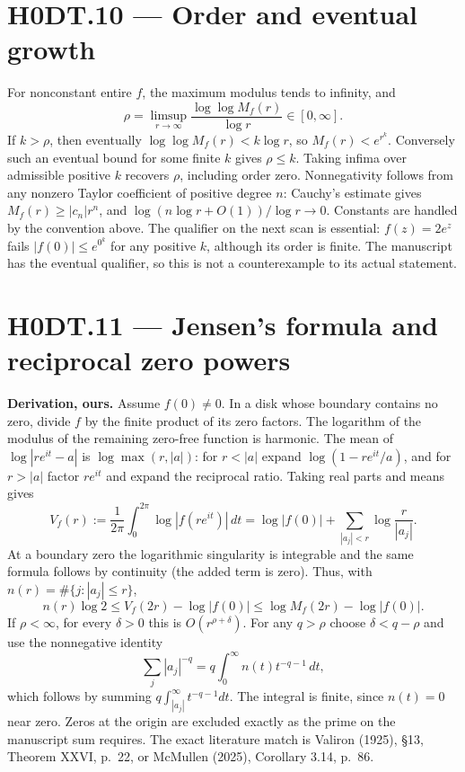\section*{H0DT.10 --- Order and eventual growth}
For nonconstant entire $f$, the maximum modulus tends to infinity, and
\[
 \rho=\limsup_{r\to\infty}\frac{\log\log M_f(r)}{\log r}\in[0,\infty].
\]
If $k>\rho$, then eventually $\log\log M_f(r)<k\log r$, so $M_f(r)<e^{r^k}$. Conversely such an eventual bound for some finite $k$ gives $\rho\le k$. Taking infima over admissible positive $k$ recovers $\rho$, including order zero. Nonnegativity follows from any nonzero Taylor coefficient of positive degree $n$: Cauchy's estimate gives $M_f(r)\ge |c_n|r^n$, and $\log(n\log r+O(1))/\log r\to0$. Constants are handled by the convention above. The qualifier on the next scan is essential: $f(z)=2e^z$ fails $|f(0)|\le e^{0^k}$ for any positive $k$, although its order is finite. The manuscript has the eventual qualifier, so this is not a counterexample to its actual statement.

\section*{H0DT.11 --- Jensen's formula and reciprocal zero powers}
\textbf{Derivation, ours.} Assume $f(0)\ne0$. In a disk whose boundary contains no zero, divide $f$ by the finite product of its zero factors. The logarithm of the modulus of the remaining zero-free function is harmonic. The mean of $\log|re^{it}-a|$ is $\log\max(r,|a|)$: for $r<|a|$ expand $\log(1-re^{it}/a)$, and for $r>|a|$ factor $re^{it}$ and expand the reciprocal ratio. Taking real parts and means gives
\[
 V_f(r):=\frac1{2\pi}\int_0^{2\pi}\log|f(re^{it})|\,dt
 =\log|f(0)|+\sum_{|a_j|<r}\log\frac r{|a_j|}.
\]
At a boundary zero the logarithmic singularity is integrable and the same formula follows by continuity (the added term is zero). Thus, with $n(r)=\#\{j:|a_j|\le r\}$,
\[
 n(r)\log2\le V_f(2r)-\log|f(0)|\le\log M_f(2r)-\log|f(0)|.
\]
If $\rho<\infty$, for every $\delta>0$ this is $O(r^{\rho+\delta})$. For any $q>\rho$ choose $\delta<q-\rho$ and use the nonnegative identity
\[
 \sum_j|a_j|^{-q}=q\int_0^\infty n(t)t^{-q-1}\,dt,
\]
which follows by summing $q\int_{|a_j|}^\infty t^{-q-1}dt$. The integral is finite, since $n(t)=0$ near zero. Zeros at the origin are excluded exactly as the prime on the manuscript sum requires. The exact literature match is Valiron (1925), \S13, Theorem XXVI, p.~22, or McMullen (2025), Corollary 3.14, p.~86.

